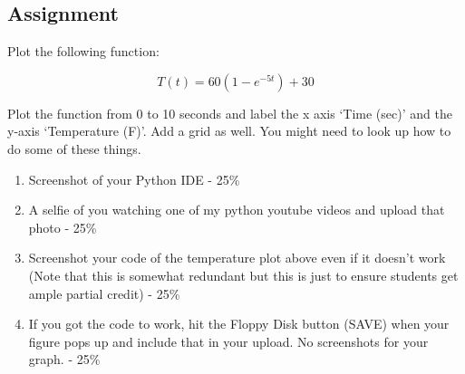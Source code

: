 \subsection{Assignment}

Plot the following function: 

\begin{equation}
  T(t) = 60(1-e^{-5t})+30
\end{equation}

Plot the function from 0 to 10 seconds and label the x axis ‘Time
(sec)’ and the y-axis ‘Temperature (F)’. Add a grid as well. You might
need to look up how to do some of these things.



\begin{enumerate}[itemsep=-5pt]
  \item Screenshot of your Python IDE - 25\%
  \item A selfie of you watching one of my python youtube videos and upload that photo - 25\%
  \item Screenshot your code of the temperature plot above even if it doesn’t work (Note that this is somewhat redundant but this is just to ensure students get ample partial credit) - 25\%
  \item If you got the code to work, hit the Floppy Disk button (SAVE)
    when your figure pops up and include that in your upload. No screenshots for your graph. - 25\%
\end{enumerate}
